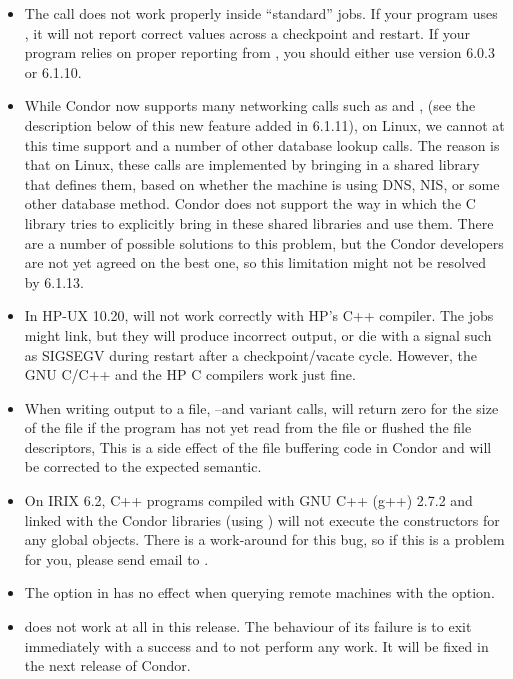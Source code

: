\begin{itemize}

\item The  call does not work properly inside
``standard'' jobs.  
If your program uses , it will not report correct values
across a checkpoint and restart.
If your program relies on proper reporting from , you
should either use version 6.0.3 or 6.1.10.

\item While Condor now supports many networking calls such as
 and , (see the description below of this
new feature added in 6.1.11), on Linux, we cannot at this time support
 and a number of other database lookup calls.
The reason is that on Linux, these calls are implemented by bringing in a
shared library that defines them, based on whether the machine is using
DNS, NIS, or some other database method.
Condor does not support the way in which the C library tries to explicitly
bring in these shared libraries and use them.
There are a number of possible solutions to this problem, but the Condor
developers are not yet agreed on the best one, so this limitation might not
be resolved by 6.1.13.

\item In HP-UX 10.20,  will not work correctly with HP's
C++ compiler. 
The jobs might link, but they will produce incorrect output, or die with
a signal such as SIGSEGV during restart after a checkpoint/vacate cycle.
However, the GNU C/C++ and the HP C compilers work just fine.

\item When writing output to a file, --and variant calls,
will return zero for the size of the file if the program has not yet
read from the file or flushed the file descriptors,
This is a side effect of the file buffering code in Condor and will be
corrected to the expected semantic.

\item On IRIX 6.2, C++ programs compiled with GNU C++ (g++) 2.7.2 and
linked with the Condor libraries (using ) will not
execute the constructors for any global objects.
There is a work-around for this bug, so if this is a problem for you,
please send email to .

\item The  option in  has no effect when querying
remote machines with the  option.

\item {} does not work at all in this release. 
The behaviour of its failure is to exit immediately with a success and
to not perform any work. It will be fixed in the next release of Condor.

\end{itemize}


